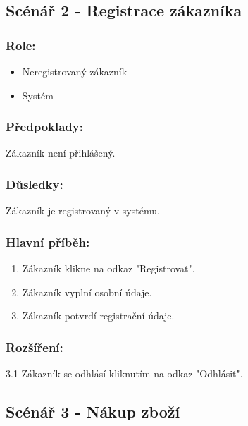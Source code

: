 \documentclass[11pt,twoside,a4paper]{book}
\begin{document}
\subsection{Scénář 2 - Registrace zákazníka}

\subsubsection*{Role:}

\begin{itemize}
\item Neregistrovaný zákazník
\item Systém
\end{itemize}

\subsubsection*{Předpoklady:}

Zákazník není přihlášený.

\subsubsection*{Důsledky:}

Zákazník je registrovaný v systému.

\subsubsection*{Hlavní příběh:}

\begin{enumerate}
\item Zákazník klikne na odkaz "Registrovat".
\item Zákazník vyplní osobní údaje.
\item Zákazník potvrdí registrační údaje.
\end{enumerate}

\subsubsection*{Rozšíření:}

\begin{description}
\item 3.1 Zákazník se odhlásí kliknutím na odkaz "Odhlásit".
\end{description}

\subsection{Scénář 3 - Nákup zboží}
\end{document}
